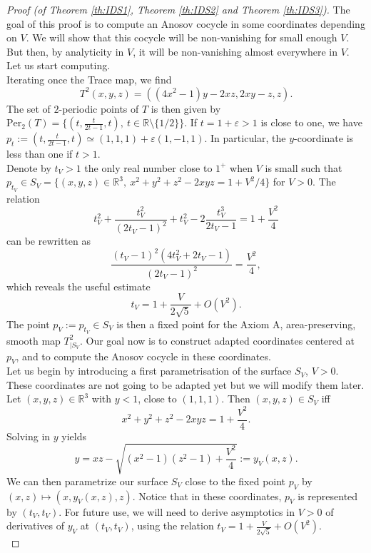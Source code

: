 \documentclass[a4paper]{article}
\theoremstyle{definition}
\begin{document}
\begin{proof}[Proof (of Theorem \ref{th:IDS1}, Theorem \ref{th:IDS2} and Theorem \ref{th:IDS3})] 
The goal of this proof is to compute an Anosov cocycle in some coordinates depending on $V$. We will show that this cocycle will be non-vanishing for small enough $V$. But then, by analyticity in $V$, it will be non-vanishing almost everywhere in $V$. Let us start computing.\\

Iterating once the Trace map, we find
$$ T^2(x,y,z) = ((4x^2-1)y-2xz,2xy-z,z). $$
The set of $2$-periodic points of $T$ is then given by $\text{Per}_2(T) = \{ (t,\frac{t}{2t-1},t), \ t \in \mathbb{R} \setminus \{ 1/2\} \}$. If $t = 1+\varepsilon > 1$ is close to one, we have $p_t := (t,\frac{t}{2t-1},t) \simeq (1,1,1) + \varepsilon(1,-1,1)$. In particular, the $y$-coordinate is less than one if $t>1$. \\

Denote by $t_V>1$ the only real number close to $1^+$ when $V$ is small such that $p_{t_V} \in S_V = \{ (x,y,z) \in \mathbb{R}^3, \  x^2+y^2+z^2 - 2xyz = 1 + V^2/4 \} $ for $V>0$. The relation 
$$ t_V^2 + \frac{t_V^2}{(2t_V-1)^2} +t_V^2 - 2 \frac{t_V^3}{2t_V-1} = 1+ \frac{V^2}{4} $$
can be rewritten as $$ \frac{(t_V-1)^2(4t_V^2+2t_V-1)}{(2t_V-1)^2} = \frac{V^2}{4}, $$
which reveals the useful estimate $$t_V = 1+\frac{V}{2\sqrt{5}} + O(V^2).$$
The point $p_V := p_{t_V} \in S_V$ is then a fixed point for the Axiom A, area-preserving, smooth map $T^2_{|S_V}$. Our goal now is to construct adapted coordinates centered at $p_V$, and to compute the Anosov cocycle in these coordinates.  \\

Let us begin by introducing a first parametrisation of the surface $S_V$, $V>0$. These coordinates are not going to be adapted yet but we will modify them later. Let $(x,y,z) \in \mathbb{R}^3$ with $y<1$, close to $(1,1,1)$. Then $(x,y,z) \in S_V$ iff $$x^2+y^2+z^2 - 2x y z = 1+\frac{V^2}{4}. $$
Solving in $y$ yields
$$ y = xz - \sqrt{(x^2-1)(z^2-1) + \frac{V^2}{4}} := y_V(x,z). $$
We can then parametrize our surface $S_V$ close to the fixed point $p_V$ by 
$(x,z) \mapsto (x,y_V(x,z),z)$.
Notice that in these coordinates, $p_V$ is represented by $(t_V,t_V)$. For future use, we will need to derive asymptotics in $V>0$ of derivatives of $y_V$ at $(t_V,t_V)$, using the relation $t_V = 1 + \frac{V}{2 \sqrt{5}} + O(V^2)$. \\


\end{proof}
\end{document}

